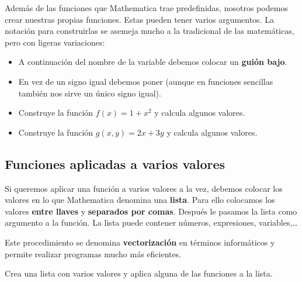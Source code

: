 \documentclass[a4paper,10pt, draft]{article}
\newcommand{\com}[1]{\textbf{\color{blue}{#1}}}
\newenvironment{ejer}{\begin{tcolorbox}[center title, title=Ejercicios,
fonttitle=\sffamily\bfseries,colback=blue!5,colframe=orange]}{\end{tcolorbox}}
\begin{document}
Además de las funciones que Mathematica trae predefinidas, nosotros podemos crear nuestras propias funciones. Estas pueden tener varios argumentos. La notación para construirlas se asemeja mucho a la tradicional de las matemáticas, pero con ligeras variaciones:

\begin{itemize}

\item A continuación del nombre de la variable debemos colocar un \textbf{guión bajo}.

\item En vez de un signo igual debemos poner \com{:=} (aunque en funciones sencillas también nos sirve un único signo igual).

\end{itemize}

\begin{ejer}

\begin{itemize}

\item Construye la función $f(x)=1+x^2$ y calcula algunos valores.

\item Construye la función $g(x,y)=2x+3y$ y calcula algunos valores.

\end{itemize}

\end{ejer} 

 \newpage

\subsection{Funciones aplicadas a varios valores}

Si queremos aplicar una función a varios valores a la vez, debemos colocar los valores en lo que Mathematica denomina una \textbf{lista}. Para ello colocamos los valores \textbf{entre llaves} y \textbf{separados por comas}. Después le pasamos la lista como argumento a la función. La lista puede contener números, expresiones, variables,\dots

Este procedimiento se denomina \textbf{vectorización} en términos informáticos y permite realizar programas mucho más eficientes.

\begin{ejer}

Crea una lista con varios valores y aplica alguna de las funciones a la lista.

\end{ejer}  
\end{document}
